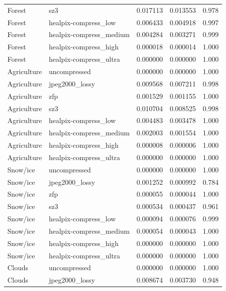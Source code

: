 \begin{table}[t]
\begin{tabular}{@{}llrrr@{}}
Forest      & sz3                      & 0.017113 & 0.013553 & 0.978 \\
Forest      & healpix-compress\_low    & 0.006433 & 0.004918 & 0.997 \\
Forest      & healpix-compress\_medium & 0.004284 & 0.003271 & 0.999 \\
Forest      & healpix-compress\_high   & 0.000018 & 0.000014 & 1.000 \\
Forest      & healpix-compress\_ultra  & 0.000000 & 0.000000 & 1.000 \\
\addlinespace
Agriculture & uncompressed             & 0.000000 & 0.000000 & 1.000 \\
Agriculture & jpeg2000\_lossy          & 0.009568 & 0.007211 & 0.998 \\
Agriculture & zfp                      & 0.001529 & 0.001155 & 1.000 \\
Agriculture & sz3                      & 0.010704 & 0.008525 & 0.998 \\
Agriculture & healpix-compress\_low    & 0.004483 & 0.003478 & 1.000 \\
Agriculture & healpix-compress\_medium & 0.002003 & 0.001554 & 1.000 \\
Agriculture & healpix-compress\_high   & 0.000008 & 0.000006 & 1.000 \\
Agriculture & healpix-compress\_ultra  & 0.000000 & 0.000000 & 1.000 \\
\addlinespace
Snow/ice    & uncompressed             & 0.000000 & 0.000000 & 1.000 \\
Snow/ice    & jpeg2000\_lossy          & 0.001252 & 0.000992 & 0.784 \\
Snow/ice    & zfp                      & 0.000055 & 0.000044 & 1.000 \\
Snow/ice    & sz3                      & 0.000534 & 0.000437 & 0.961 \\
Snow/ice    & healpix-compress\_low    & 0.000094 & 0.000076 & 0.999 \\
Snow/ice    & healpix-compress\_medium & 0.000054 & 0.000043 & 1.000 \\
Snow/ice    & healpix-compress\_high   & 0.000000 & 0.000000 & 1.000 \\
Snow/ice    & healpix-compress\_ultra  & 0.000000 & 0.000000 & 1.000 \\
\addlinespace
Clouds      & uncompressed             & 0.000000 & 0.000000 & 1.000 \\
Clouds      & jpeg2000\_lossy          & 0.008674 & 0.003730 & 0.948 \\

\end{tabular}
\end{table}
